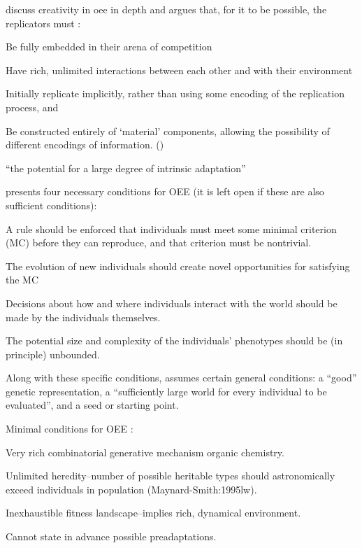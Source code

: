 \begin{NOTES}
\Textcite{Taylor2001,Taylor:1999sc} discuss creativity in \gls{oee} in depth and argues that, for it to be possible, the replicators must \parencite{Hutton2004}:
\begin{compactenum}
	\item Be fully embedded in their arena of competition 
	\item Have rich, unlimited interactions between each other and with their environment 
	\item Initially replicate implicitly, rather than using some encoding of the replication process, and 
	\item Be constructed entirely of `material' components, allowing the possibility of different encodings of information. ()
\end{compactenum}

``the potential for a large degree of intrinsic adaptation'' \parencite{Taylor2001}

\parencite{Soros2014} presents four necessary conditions for OEE (it is left open if these are also sufficient conditions):
\begin{compactenum}
	\item A rule should be enforced that individuals must meet some minimal criterion (MC) before they can reproduce, and that criterion must be nontrivial.
	\item The evolution of new individuals should create novel opportunities for satisfying the MC
	\item Decisions about how and where individuals interact with the world should be made by the individuals themselves.
	\item The potential size and complexity of the individuals' phenotypes should be (in principle) unbounded.
\end{compactenum}
Along with these specific conditions, \parencite{Soros2014} assumes certain general conditions: a ``good'' genetic representation, a ``sufficiently large world for every individual to be evaluated'', and a seed or starting point.

Minimal conditions for OEE \parencite{Vasas2015}:
\begin{compactenum}
	\item Very rich combinatorial generative mechanism \eg organic chemistry.
	\item Unlimited heredity--number of possible heritable types should astronomically exceed individuals in population (Maynard-Smith:1995lw).
	\item Inexhaustible fitness landscape--implies rich, dynamical environment.
	\item Cannot state in advance possible preadaptations.
\end{compactenum}


\end{NOTES}
